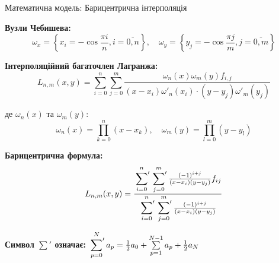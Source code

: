 \documentclass[11pt, aspectratio=169]{beamer}
\begin{document}
\begin{frame}{Математична модель: Барицентрична інтерполяція}
	\scriptsize
	
	\textbf{Вузли Чебишева:}
	\begin{equation*}
		\omega_x = \left\{x_i = -\cos \frac{\pi i}{n}, i = \overline{0,n}\right\}, \quad \omega_y = \left\{y_j = -\cos \frac{\pi j}{m}, j = \overline{0,m}\right\}
	\end{equation*}
	
	\vspace{-0.2cm} %
	\textbf{Інтерполяційний багаточлен Лагранжа:}
	\begin{equation*}
		L_{n, m}(x, y) = \sum_{i=0}^{n} \sum_{j=0}^{m} \frac{\omega_n(x) \omega_m(y) f_{i, j}}{(x-x_i) \omega'_n(x_i) \cdot (y-y_j) \omega'_m(y_j)}
	\end{equation*}
	
	\vspace{-0.3cm} %
	де $\omega_n(x)$ та $\omega_m(y)$:
	\begin{equation*}
		\omega_n(x) = \prod_{k=0}^{n}(x-x_k), \quad \omega_m(y) = \prod_{l=0}^{m}(y-y_l)
	\end{equation*}
	
	\vspace{-0.2cm}
	\textbf{Барицентрична формула:}
	\begin{equation*}
		L_{n,m}(x, y) = \frac{\sideset{}{'}\sum\limits_{i=0}^{n} \sideset{}{'}\sum\limits_{j=0}^{m} \frac{(-1)^{i+j}}{(x-x_i)(y-y_j)} f_{ij}}{\sideset{}{'}\sum\limits_{i=0}^{n} \sideset{}{'}\sum\limits_{j=0}^{m} \frac{(-1)^{i+j}}{(x-x_i)(y-y_j)}}
	\end{equation*}
	
	\vspace{-0.1cm}
	\textbf{Символ $\sum'$ означає:} $\sideset{}{'}\sum\limits_{p=0}^{N} a_p = \frac{1}{2} a_0 + \sum\limits_{p=1}^{N-1} a_p + \frac{1}{2} a_N$
\end{frame}
	
\end{document}

